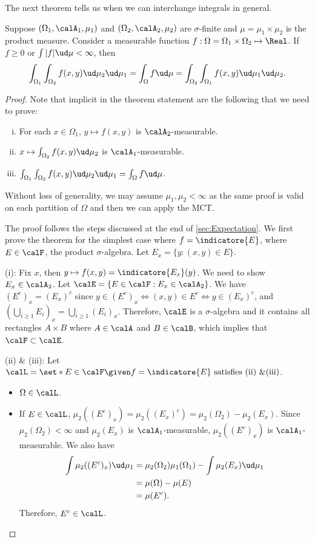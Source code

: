 \documentclass[../aipt.tex]{subfiles}
\begin{document}
The next theorem tells us when we can interchange integrals in general.
\begin{Theorem}\label{wk5:Fubini_theorem}
Suppose $(\Omega_1, \calA_1, \mu_1)$ and $(\Omega_2, \calA_2, \mu_2)$ are $\sigma$-finite and $\mu = \mu_1 \times \mu_2$ is the product measure. Consider a measurable function $f:\Omega=\Omega_1\times\Omega_2 \mapsto \Real$. If $f \geq 0$ or $\int{|f|} \ud\mu< \infty$, then
\begin{align*}
\int_{\Omega_1} \int_{\Omega_2} f (x,y) \ud \mu_2 \ud \mu_1 = \int_{\Omega} f \ud \mu = \int_{\Omega_2} \int_{\Omega_1} f (x,y) \ud \mu_1 \ud \mu_2.
\end{align*}
\end{Theorem}
\begin{proof}
Note that implicit in the theorem statement are the following that we need to prove:
\begin{enumerate}[(i)]
\item For each $x \in \Omega_1$, $y \mapsto f(x,y)$ is $\calA_2$-measurable.
\item  $x \mapsto \int_{\Omega_2} f(x,y) \ud \mu_2$ is $\calA_1$-measurable.
\item $\int_{\Omega_1} \int_{\Omega_2} f (x,y) \ud \mu_2 \ud \mu_1 = \int_{\Omega} f \ud \mu$.
\end{enumerate}
Without loss of generality, we may assume $\mu_1,\mu_2<\infty$ as the same proof is valid on each partition of $\Omega$ and then we can apply the MCT.

The proof follows the steps discussed at the end of \cref{sec:Expectation}. We first prove the theorem for the simplest case where $f = \indicatore{E}$, where $E\in \calF$, the product $\sigma$-algebra. Let $E_x=\{y:(x,y)\in E\}$. 

(i): Fix $x$, then $y \mapsto f(x,y)= \indicatore{E_x}(y)$. We need to show $E_x \in \calA_2$. Let $\calE=\{E \in \calF : E_x \in \calA_2\}$. We have $(E^c)_x=(E_x)^c$ since $y \in (E^c)_x \Leftrightarrow (x,y)\in E^c \Leftrightarrow y\in (E_x)^c$, and $\left(\bigcup_{i\geq1} E_i\right)_x = \bigcup_{i\geq1} (E_i)_x$. Therefore, $\calE$ is a $\sigma$-algebra and it contains all rectangles $A \times B$ where $A\in \calA$ and $B\in \calB$, which implies that $\calF \subset \calE$.

(ii) $\&$ (iii): Let $\calL=\set*{E \in \calF\given f= \indicatore{E} \text{ satisfies (ii) \&(iii)}}$. 
\begin{itemize}
\item $\Omega \in \calL$.
\item  If $E \in \calL$, $\mu_2((E^c)_x) =\mu_2((E_x)^c)=\mu_2(\Omega_2)-\mu_2(E_x)$. Since $\mu_2(\Omega_2)< \infty$ and $\mu_2(E_x)$ is $\calA_1$-measurable, $\mu_2((E^c)_x)$ is $\calA_1$-measurable. We also have
\begin{align*}
\int \mu_2((E^c)_x) \ud \mu_1
& =\mu_2(\Omega_2)\mu_1(\Omega_1)-\int \mu_2(E_x) \ud \mu_1\\
& =\mu(\Omega)-\mu(E)\\
& =\mu(E^c).
\end{align*}
Therefore, $E^c \in \calL$.


\end{itemize}
\end{proof}
\end{document}
